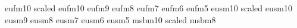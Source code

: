 \usepackage{fancyheadings}
\usepackage{amsmath}
\usepackage{amssymb}
\usepackage{psfig}
\usepackage{here}
\usepackage{array}
\usepackage{alltt}
\usepackage{graphicx}
\usepackage{eepic,epic}
\usepackage[latin1]{inputenc}
\usepackage[T1]{fontenc}


\newfont{\eufmtwelve}   {eufm10 scaled }
\newfont{\eufmten}      {eufm10 }
\newfont{\eufmnine}     {eufm9 }
\newfont{\eufmeight}    {eufm8 }
\newfont{\eufmseven}    {eufm7 }
\newfont{\eufmsix}      {eufm6 }
\newfont{\eufmfive}     {eufm5 }
\newfont{\eusmtwelve}   {eusm10 scaled }
\newfont{\eusmten}      {eusm10}
\newfont{\eusmnine}     {eusm9 }
\newfont{\eusmeight}    {eusm8 }
\newfont{\eusmseven}    {eusm7 }
\newfont{\eusmsix}      {eusm6 }
\newfont{\eusmfive}     {eusm5 }
\newfont{\msbmtwelve}   {msbm10 scaled }
\newfont{\msbmeight}    {msbm8}

\newcommand{\udl}{\underline}
\newcommand{\udll}[1]{{\udl{\udl{#1}}}}
\newcommand{\udlll}[1]{{\udl{\udl{\udl{#1}}}}}
\newcommand{\mat}[1]{{\mbox{\msbmtwelve {#1}}}}
\newcommand{\Reel}{{\mbox{\msbmtwelve R}}}      %
\newcommand{\reel}{{\mbox{\msbmeight R}}}       %
\newcommand{\Complex}{\mbox{\msbmtwelve C}}     %
\newcommand{\Naturel}{\mbox{\msbmtwelve N}}  %
\newcommand{\naturel}{\mbox{\msbmeight N}}   %

